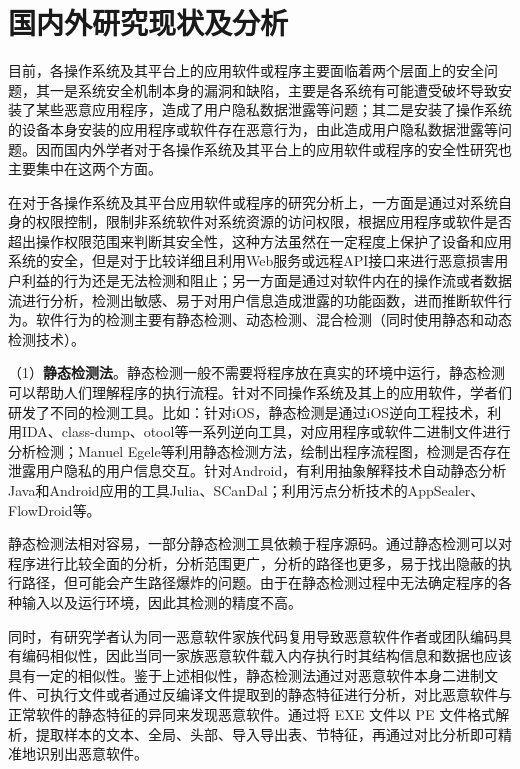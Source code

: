 
\section{国内外研究现状及分析}

目前，各操作系统及其平台上的应用软件或程序主要面临着两个层面上的安全问题，其一是系统安全机制本身的漏洞和缺陷，主要是各系统有可能遭受破坏导致安装了某些恶意应用程序，造成了用户隐私数据泄露等问题；其二是安装了操作系统的设备本身安装的应用程序或软件存在恶意行为，由此造成用户隐私数据泄露等问题。因而国内外学者对于各操作系统及其平台上的应用软件或程序的安全性研究也主要集中在这两个方面。 

在对于各操作系统及其平台应用软件或程序的研究分析上，一方面是通过对系统自身的权限控制，限制非系统软件对系统资源的访问权限，根据应用程序或软件是否超出操作权限范围来判断其安全性，这种方法虽然在一定程度上保护了设备和应用系统的安全，但是对于比较详细且利用Web服务或远程API接口来进行恶意损害用户利益的行为还是无法检测和阻止；另一方面是通过对软件内在的操作流或者数据流进行分析，检测出敏感、易于对用户信息造成泄露的功能函数，进而推断软件行为。软件行为的检测主要有静态检测、动态检测、混合检测（同时使用静态和动态检测技术）。

（1）\textbf{静态检测法}。静态检测一般不需要将程序放在真实的环境中运行，静态检测可以帮助人们理解程序的执行流程。针对不同操作系统及其上的应用软件，学者们研发了不同的检测工具。比如：针对iOS，静态检测是通过iOS逆向工程技术\cite{沙梓社2014IOS}，利用IDA、class-dump、otool等一系列逆向工具\cite{zdziarski2012hacking}，对应用程序或软件二进制文件进行分析检测；Manuel Egele等\cite{egele2011pios}利用静态检测方法，绘制出程序流程图，检测是否存在泄露用户隐私的用户信息交互。针对Android，有利用抽象解释技术自动静态分析Java和Android应用的工具Julia\cite{payet2012static}、SCanDal\cite{kim2012scandal}；利用污点分析技术的AppSealer\cite{2014AppSealer}、FlowDroid\cite{arzt2014flowdroid}等。   
   
静态检测法相对容易，一部分静态检测工具依赖于程序源码。通过静态检测可以对程序进行比较全面的分析，分析范围更广，分析的路径也更多，易于找出隐蔽的执行路径，但可能会产生路径爆炸的问题。由于在静态检测过程中无法确定程序的各种输入以及运行环境，因此其检测的精度不高。

同时，有研究学者认为同一恶意软件家族代码复用导致恶意软件作者或团队编码具有编码相似性\cite{宋文纳2019恶意代码演化与溯源技术研究}，因此当同一家族恶意软件载入内存执行时其结构信息和数据也应该具有一定的相似性。鉴于上述相似性，静态检测法通过对恶意软件本身二进制文件、可执行文件或者通过反编译文件提取到的静态特征进行分析，对比恶意软件与正常软件的静态特征的异同来发现恶意软件。通过将 EXE 文件以 PE 文件格式解析，提取样本的文本、全局、头部、导入导出表、节特征，再通过对比分析即可精准地识别出恶意软件。 

